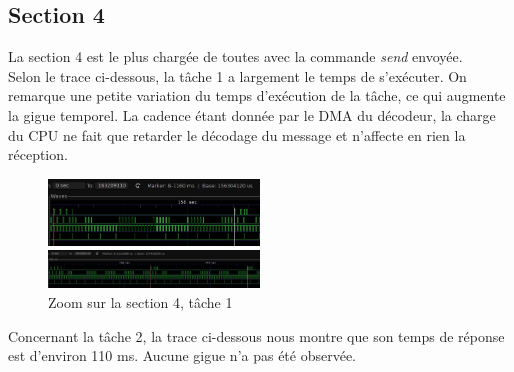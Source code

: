 \documentclass[11pt, a4paper]{article}
\begin{document}
\subsection{Section 4}

La section 4 est le plus chargée de toutes avec la commande \textit{send} envoyée. \\

Selon le trace ci-dessous, la tâche 1 a largement le temps de s'exécuter.
On remarque une petite variation du temps d'exécution de la tâche, ce qui augmente la gigue temporel.
La cadence étant donnée par le DMA du décodeur, la charge du CPU ne fait que retarder le décodage du message et n'affecte en rien la réception.

\begin{figure}[H]
    \begin{multicols}{2}
        \begin{center}
            \includegraphics[width=0.5\textwidth]{section4_send_t1_light_1}
        \end{center}
        \columnbreak
        \begin{center}
            \includegraphics[width=0.5\textwidth]{section4_send_t1_light_2}
        \end{center}
    \end{multicols}
    \caption{Zoom sur la section 4, tâche 1}
    \label{Zoom sur la section 4, tâche 1}
\end{figure}

Concernant la tâche 2, la trace ci-dessous nous montre que son temps de réponse est d'environ 110 ms.
Aucune gigue n'a pas été observée.
\end{document}
